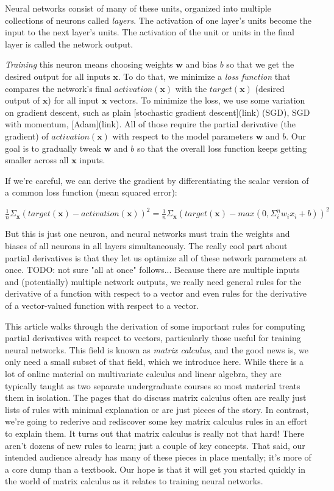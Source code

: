 \documentclass[11pt]{article}
\begin{document}
Neural networks consist of many of these units, organized into multiple collections of neurons called {\em layers}. The activation of one layer's units become the input to the next layer's units. The activation of the unit or units in the final layer is called the network output.

{\em Training} this neuron means choosing weights $\mathbf{w}$ and bias $b$ so that we get the desired output for all inputs $\mathbf{x}$.  To do that, we minimize a {\em loss function} that compares the network's final $activation({\mathbf{x}})$ with the $target(\mathbf{x})$ (desired output of $\mathbf{x}$) for all input $\mathbf{x}$ vectors. To minimize the loss, we use some variation on gradient descent, such as plain [stochastic gradient descent](link) (SGD), SGD with momentum, [Adam](link).   All of those require the partial derivative (the gradient) of $activation({\mathbf{x}})$ with respect to the model parameters $\mathbf{w}$ and $b$. Our goal is to gradually tweak $\mathbf{w}$ and $b$ so that the overall loss function keeps getting smaller across all $\mathbf{x}$ inputs.

If we're careful, we can derive the gradient by differentiating the scalar version of a common loss function (mean squared error):

$\frac{1}{n} \Sigma_{\mathbf{x}} (target(\mathbf{x}) - activation(\mathbf{x}))^2 = \frac{1}{n} \Sigma_{\mathbf{x}} (target(\mathbf{x}) - max(0, \Sigma_i^n w_i x_i + b))^2$

But this is just one neuron, and neural networks must train the weights and biases of all neurons in all layers simultaneously.  The really cool part about partial derivatives is that they let us optimize all of these network parameters at once. TODO: not sure "all at once" follows... Because there are multiple inputs and (potentially) multiple network outputs, we really need general rules for the derivative of a function with respect to a vector and even rules for the derivative of a vector-valued function with respect to a vector.

This article walks through the derivation of some important rules for computing partial derivatives with respect to vectors, particularly those useful for training neural networks. This field is known as {\em matrix calculus}, and the good news is, we only need a small subset of that field, which we introduce here.  While there is a lot of online material on multivariate calculus and linear algebra, they are typically taught as two separate undergraduate courses so most material treats them in isolation.  The pages that do discuss matrix calculus often are really just lists of rules with minimal explanation or are just pieces of the story.  In contrast, we're going to rederive and rediscover some key matrix calculus rules in an effort to explain them. It turns out that matrix calculus is really not that hard! There aren't dozens of new rules to learn; just a couple of key concepts.  That said, our intended audience already has many of these pieces in place mentally; it's more of a core dump than a textbook. Our hope is that it will get you started quickly in the world of matrix calculus as it relates to training neural networks.
\end{document}

